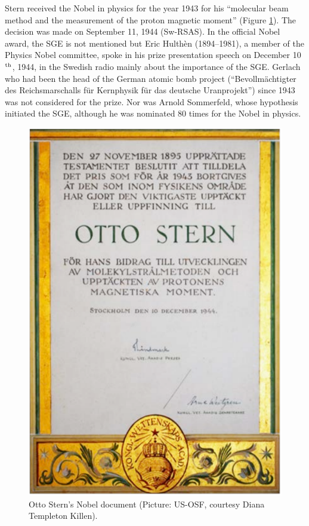 \documentclass{article}
\begin{document}
Stern received the Nobel in physics for the year 1943 for his ``molecular beam method and the measurement of the proton magnetic moment'' (Figure \ref{fig:Nobel_doc}). The decision was made on September 11, 1944 (Sw-RSAS). In the official Nobel award, the SGE is not mentioned but Eric Hulthèn (1894--1981), a member of the Physics Nobel committee, spoke in his prize presentation speech on December 10$^{\rm th}$, 1944, in the Swedish radio mainly about the importance of the SGE. Gerlach who had been the head of the German atomic bomb project (``Bevollmächtigter des Reichsmarschalls für Kernphysik für das deutsche Uranprojekt'') since 1943 was not considered for the prize. Nor was Arnold Sommerfeld, whose hypothesis initiated the SGE, although he was nominated 80 times for the Nobel in physics. 
%
\begin{figure}
\begin{center}
\includegraphics[scale=0.45]{figures/Nobel_doc}
\caption{Otto Stern's Nobel document (Picture: US-OSF, courtesy Diana Templeton Killen). }
\label{fig:Nobel_doc}
\end{center}
\end{figure}
\end{document}
